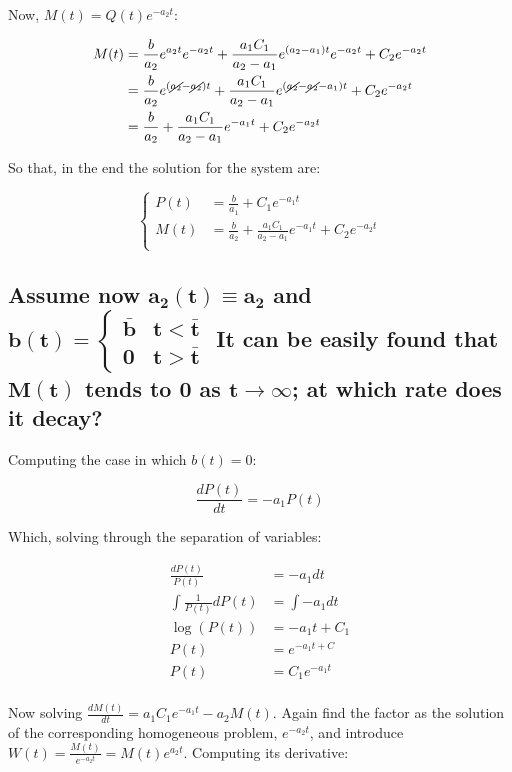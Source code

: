   Now, $M(t) = Q(t) e^{-a_2t}$:

  \begin{align*}
    M(t) &= \frac{b}{a_2}e^{a_2t}e^{-a_2t} + \frac{a_1C_1}{a_2-a_1}e^{(a_2-a_1)t}e^{-a_2t} + C_2e^{-a_2t}\\
         &= \frac{b}{a_2}e^{(\cancel{a_2}-\cancel{a_2})t} + \frac{a_1C_1}{a_2-a_1}e^{(\cancel{a_2}-\cancel{a_2}-a_1)t} + C_2e^{-a_2t}\\
         &= \frac{b}{a_2} + \frac{a_1C_1}{a_2-a_1}e^{-a_1t} + C_2e^{-a_2t}\\
  \end{align*}

  So that, in the end the solution for the system are:

  $$\begin{cases}
    P(t) &= \frac{b}{a_1} + C_1e^{-a_1t}\\
    M(t) &= \frac{b}{a_2} + \frac{a_1C_1}{a_2-a_1}e^{-a_1t} + C_2e^{-a_2t}\\
  \end{cases}$$

  \subsection{Assume now $\mathbf{a_2(t) \equiv a_2}$ and $\mathbf{b(t) = \begin{cases} \bar{b} & t < \bar{t}\\0 &t > \bar{t}\end{cases}}$ It can be easily found that $\mathbf{M(t)}$ tends to $\mathbf{0}$ as $\mathbf{t\to\infty}$; at which rate does it decay?}

  Computing the case in which $b(t) = 0$:

  $$\frac{dP(t)}{dt} = -a_1P(t)$$

  Which, solving through the separation of variables:

  \begin{align*}
    \frac{dP(t)}{P(t)} &= -a_1dt\\
    \int\frac{1}{P(t)}dP(t) &= \int -a_1dt\\
    \log(P(t)) &= -a_1t + C_1\\
    P(t) &= e^{-a_1t + C}\\
    P(t) &= C_1e^{-a_1t}\\
  \end{align*}

  Now solving $\frac{dM(t)}{dt} = a_1C_1e^{-a_1t} - a_2M(t)$.
  Again find the factor as the solution of the corresponding homogeneous problem, $e^{-a_2t}$, and introduce $W(t) = \frac{M(t)}{e^{-a_2t}} = M(t)e^{a_2t}$.
  Computing its derivative:

